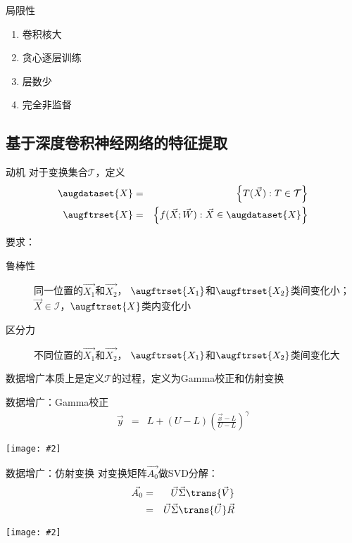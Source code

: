 \documentclass {beamer}
\newcommand{\addgraph}[2]{\begin{center}
\texttt{[image: \#2]}\end{center}}
\begin{document}
\begin{frame}{局限性}
    \begin{enumerate}
        \item 卷积核大
        \item 贪心逐层训练
        \item 层数少
        \item 完全非监督
    \end{enumerate}
\end{frame}

\subsection{基于深度卷积神经网络的特征提取}

\begin{frame}{动机}
    对于变换集合$\mathcal{T}$，定义
    \begin{eqnarray}
        \augdataset{X} &=& \left\{T(\vec{X}): T\in\mathcal{T}\right\}
            \nonumber \\
        \augftrset{X} &=& \left\{f(\vec{X};\vec{W}):
        \vec{X}\in\augdataset{X}\right\} \label{eqn:cnn:augdef}
    \end{eqnarray}

    要求：
    \begin{description}
        \item[鲁棒性] 同一位置的$\vec{X_1}$和$\vec{X_2}$，
            $\augftrset{X_1}$和$\augftrset{X_2}$类间变化\alert{小}；
            $\vec{X}\in\mathcal{I}$，$\augftrset{X}$类内变化小
        \item[区分力] 不同位置的$\vec{X_1}$和$\vec{X_2}$，
            $\augftrset{X_1}$和$\augftrset{X_2}$类间变化\alert{大}
    \end{description}

    数据增广本质上是定义$\mathcal{T}$的过程，定义为Gamma校正和仿射变换
\end{frame}

\begin{frame}{数据增广：Gamma校正}
    \begin{eqnarray}
        \vec{y} &=& L + (U-L)\left(\frac{\vec{x}-L}{U-L}\right)^\gamma
    \end{eqnarray}
    \addgraph{0.85}{res/gamma.png}
\end{frame}

\begin{frame}{数据增广：仿射变换}
    对变换矩阵$\vec{A_0}$做SVD分解：
    \begin{eqnarray}
        \vec{A_0} &=&  \vec{U}\vec{\Sigma}\trans{\vec{V}} \nonumber \\
            &=& \vec{U}\vec{\Sigma}\trans{\vec{U}}\vec{R}
    \end{eqnarray}
    \addgraph{0.75}{res/affine-eg.png}
\end{frame}
\end{document}
